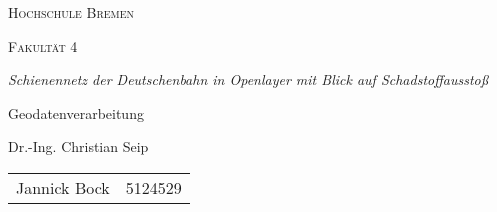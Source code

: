\documentclass{article}
\begin{document}
\begin{titlepage}
        \begin{center}
                {\scshape\LARGE Hochschule Bremen \par}
                \vspace{1cm}
                {\scshape\Large Fakultät 4 \par}
                \vspace{1cm}
                {\Large\itshape Schienennetz der Deutschenbahn in Openlayer mit Blick auf Schadstoffausstoß\par}
                \vspace{1cm}
                {\rmfamily\large  Geodatenverarbeitung \par}
                {\rmfamily\large  Dr.-Ing. Christian Seip\par}
                \vspace{2cm}
                {\large
                        \begin{tabular}{ll}
                        Jannick Bock & 5124529\\
                \end{tabular}
                }
        \end{center}
        \vfill
\end{titlepage}

\pagebreak
\tableofcontents
\pagebreak

\pagebreak

\pagebreak

\pagebreak

\pagebreak

\pagebreak

\pagebreak
{}
\listoffigures
\pagebreak
\printbibliography
\end{document}
